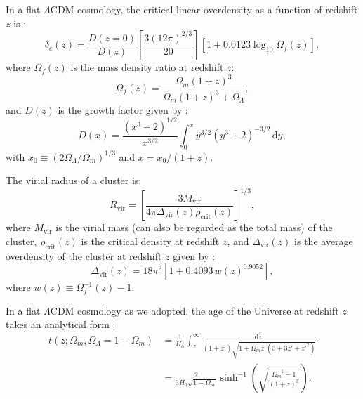 \documentclass[modern]{aastex62}
\newcommand{\R}[1]{\mathrm{#1}}
\newcommand{\D}[1]{\R{d} #1}
\newcommand{\lcdm}{$\Lambda$CDM}
\begin{document}
In a flat \lcdm{} cosmology, the critical linear overdensity as a function
of redshift $z$ is \citep{kitayama1996,randall2002}:
\begin{equation}
  \label{eq:delta-crit}
  \delta_c(z) = \frac{D(z=0)}{D(z)}
  \left[ \frac{3 (12\pi)^{2/3}}{20} \right]
  \left[1 + 0.0123 \log_{10} \Omega_f(z) \right],
\end{equation}
where $\Omega_f(z)$ is the mass density ratio at redshift $z$:
\begin{equation}
  \label{eq:omega-fz}
  \Omega_f(z) = \frac{\Omega_m(1+z)^3}{\Omega_m(1+z)^3 + \Omega_{\Lambda}},
\end{equation}
and $D(z)$ is the growth factor given by
\citep[Equation~(13.6)]{peebles1980}:
\begin{equation}
  \label{eq:growth-factor}
  D(x) = \frac{(x^3 + 2)^{1/2}}{x^{3/2}}
    \int_0^x y^{3/2} (y^3 + 2)^{-3/2} \,\D{y},
\end{equation}
with $x_0 \equiv (2\Omega_{\Lambda}/\Omega_m)^{1/3}$ and
$x = x_0 / (1+z)$.

The virial radius of a cluster is:
\begin{equation}
  \label{eq:radius-virial}
  R_{\R{vir}} = \left[
    \frac{3 M_{\R{vir}}}{4\pi \Delta_{\R{vir}}(z) \rho_{\R{crit}}(z)}
  \right]^{1/3},
\end{equation}
where $M_{\R{vir}}$ is the virial mass (can also be regarded as
the total mass) of the cluster,
$\rho_{\R{crit}}(z)$ is the critical density at redshift $z$,
and $\Delta_{\R{vir}}(z)$ is the average overdensity of the cluster
at redshift $z$ given by \citep{kitayama1996,cassano2005}:
\begin{equation}
  \label{eq:delta-vir}
  \Delta_{\R{vir}}(z) = 18\pi^2 \left[ 1 + 0.4093 \, w(z)^{0.9052} \right],
\end{equation}
where $w(z) \equiv \Omega_f^{-1}(z) - 1$.

In a flat \lcdm{} cosmology as we adopted, the age of the Universe
at redshift $z$ takes an analytical form
\citep[their Equation~(18)]{thomas2000}:
\begin{align}
  \label{eq:universe-age}
  t(z; \Omega_m, \Omega_{\Lambda}=1-\Omega_m)
    & = \frac{1}{H_0} \int_z^{\infty}
      \frac{\D{z'}}{(1+z')\sqrt{1 + \Omega_m z' (3+3z'+z'^2)}} \nonumber \\
    & = \frac{2}{3 H_0 \sqrt{1-\Omega_m}} \sinh^{-1} \!\left(
      \sqrt{\frac{\Omega_m^{-1} - 1}{(1+z)^3}} \right).
\end{align}





\end{document}
